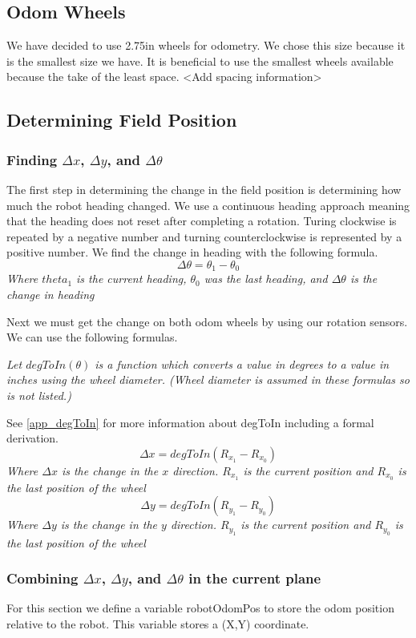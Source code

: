 \documentclass[12pt]{article}
\begin{document}
\subsection{Odom Wheels}
We have decided to use 2.75in wheels for odometry. We chose this size because it is the smallest size we have. It is beneficial to use the smallest wheels available because the take of the least space. <Add spacing information>

\pagebreak
\subsection{Determining Field Position}
\subsubsection{Finding $\Delta x$, $\Delta y$, and $\Delta\theta$}
The first step in determining the change in the field position is determining how much the robot heading changed. We use a continuous heading approach meaning that the heading does not reset after completing a rotation. Turing clockwise is repeated by a negative number and turning counterclockwise is represented by a positive number. We find the change in heading with the following formula.
$$
    \Delta \theta = \theta_1-\theta_0
$$
\textit{Where $theta_1$ is the current heading, $\theta_0$ was the last heading, and $\Delta \theta$ is the change in heading}

Next we must get the change on both odom wheels by using our rotation sensors. We can use the following formulas.

\textit{Let $degToIn(\theta)$ is a function which converts a value in degrees to a value in inches using the wheel diameter. (Wheel diameter is assumed in these formulas so is not listed.)}

See \ref{app_degToIn} for more information about degToIn including a formal derivation.
$$
    \Delta x = degToIn(R_{x_1} - R_{x_0})
$$
\textit{Where $\Delta x$ is the change in the $x$ direction. $R_{x_1}$ is the current position and $R_{x_0}$ is the last position of the wheel}
$$
    \Delta y = degToIn(R_{y_1} - R_{y_0})
$$
\textit{Where $\Delta y$ is the change in the $y$ direction. $R_{y_1}$ is the current position and $R_{y_0}$ is the last position of the wheel}

\subsubsection{Combining $\Delta x$, $\Delta y$, and $\Delta\theta$ in the current plane}
    For this section we define a variable robotOdomPos to store the odom position relative to the robot. This variable stores a (X,Y) coordinate.
\end{document}

